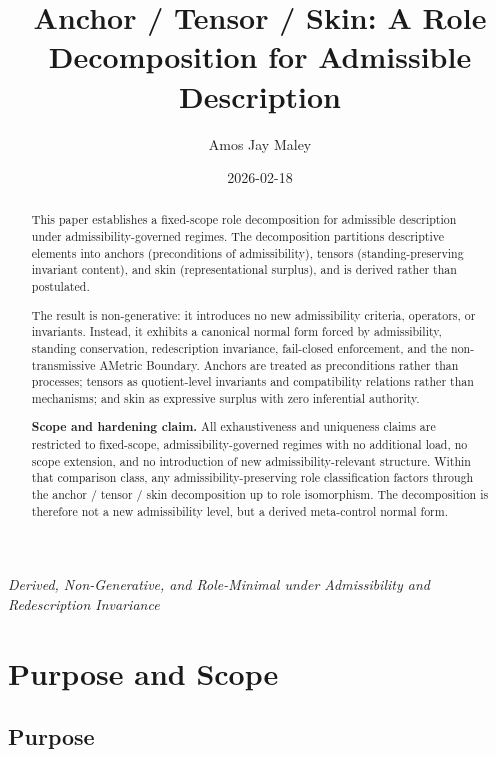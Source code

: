 \documentclass[12pt]{article}
\title{Anchor / Tensor / Skin: A Role Decomposition for Admissible Description}
\author{Amos Jay Maley}
\date{2026-02-18}
\theoremstyle{plain}
\begin{document}
\maketitle
\begin{center}
\textit{Derived, Non-Generative, and Role-Minimal under Admissibility and Redescription Invariance}
\end{center}
\onehalfspacing

\begin{abstract}

This paper establishes a fixed-scope role decomposition for admissible description under admissibility-governed regimes. The decomposition partitions descriptive elements into anchors (preconditions of admissibility), tensors (standing-preserving invariant content), and skin (representational surplus), and is derived rather than postulated.

\medskip

\noindent The result is non-generative: it introduces no new admissibility criteria, operators, or invariants. Instead, it exhibits a canonical normal form forced by admissibility, standing conservation, redescription invariance, fail-closed enforcement, and the non-transmissive AMetric Boundary. Anchors are treated as preconditions rather than processes; tensors as quotient-level invariants and compatibility relations rather than mechanisms; and skin as expressive surplus with zero inferential authority.

\medskip

\noindent \textbf{Scope and hardening claim.} All exhaustiveness and uniqueness claims are restricted to fixed-scope, admissibility-governed regimes with no additional load, no scope extension, and no introduction of new admissibility-relevant structure. Within that comparison class, any admissibility-preserving role classification factors through the anchor / tensor / skin decomposition up to role isomorphism. The decomposition is therefore not a new admissibility level, but a derived meta-control normal form.

\end{abstract}

\section{Purpose and Scope}

\subsection{Purpose}
\end{document}
